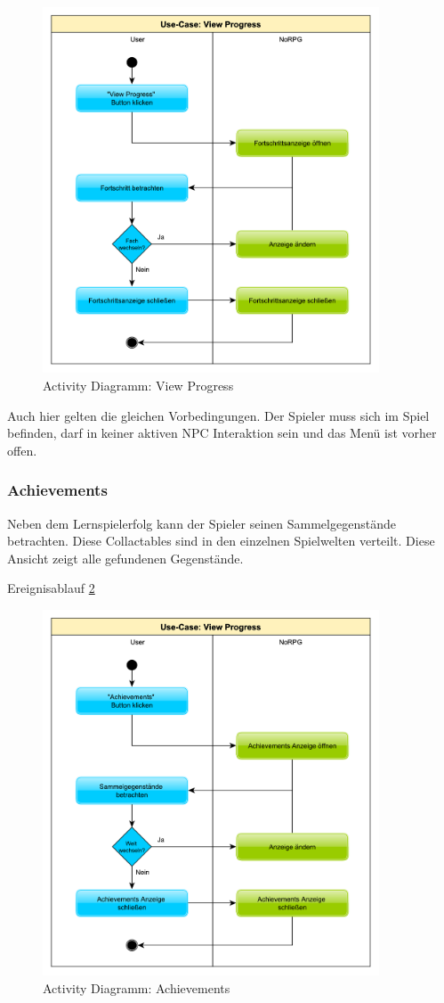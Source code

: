 			\begin{figure}[htbp]
				\centering 
				\label{umlViewProgess}
				\includegraphics[width=10cm]{pics/ViewProgress.pdf}
				\caption{Activity Diagramm: View Progress}
			\end{figure}
	
			Auch hier gelten die gleichen Vorbedingungen. Der Spieler muss sich im Spiel befinden, darf in keiner aktiven NPC Interaktion sein und das Menü ist vorher offen.
	
		\subsubsection{Achievements}
			Neben dem Lernspielerfolg kann der Spieler seinen Sammelgegenstände betrachten. Diese Collactables sind in den einzelnen Spielwelten verteilt. Diese Ansicht zeigt alle gefundenen Gegenstände.
			
			Ereignisablauf \ref{umlAchievements}
			
			\begin{figure}[htbp]
				\centering 
				\label{umlAchievements}
				\includegraphics[width=10cm]{pics/Achievements.pdf}
				\caption{Activity Diagramm: Achievements}
			\end{figure}
			

